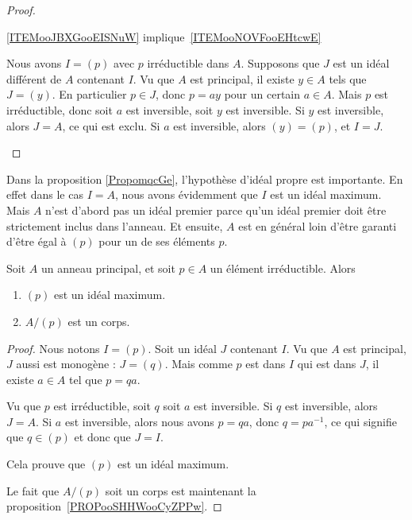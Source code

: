 \begin{proof}
\begin{subproof}
        \item[\ref{ITEMooJBXGooEISNuW} implique~\ref{ITEMooNOVFooEHtcwE}]

            Nous avons \( I=(p)\) avec \( p\) irréductible dans \( A\). Supposons que \( J\) est un idéal différent de \( A\) contenant \( I\). Vu que \( A\) est principal, il existe \( y\in A\) tels que \( J=(y)\). En particulier \( p\in J\), donc \( p=ay\) pour un certain \( a\in A\). Mais \( p\) est irréductible, donc soit \( a\) est inversible, soit \( y\) est inversible. Si \( y\) est inversible, alors \( J=A\), ce qui est exclu. Si \( a\) est inversible, alors \( (y)=(p)\), et \( I=J\).
    \end{subproof}
\end{proof}

\begin{normaltext}
    Dans la proposition \ref{PropomqcGe}, l'hypothèse d'idéal propre est importante. En effet dans le cas \( I=A\), nous avons évidemment que \( I\) est un idéal maximum. Mais \( A\) n'est d'abord pas un idéal premier parce qu'un idéal premier doit être strictement inclus dans l'anneau. Et ensuite, \( A\) est en général loin d'être garanti d'être égal à \( (p)\) pour un de ses éléments \( p\).
\end{normaltext}

\begin{proposition}     \label{PropoTMMXCx}
    Soit \( A \) un anneau principal, et soit \( p \in A \) un élément irréductible. Alors
    \begin{enumerate}
        \item
            \( (p)\) est un idéal maximum.
        \item       \label{ITEMooKPJQooWuPZXS}
            \( A/(p)\) est un corps.
    \end{enumerate}
\end{proposition}

\begin{proof}
    Nous notons \( I=(p)\). Soit un idéal \( J\) contenant \( I\). Vu que \( A\) est principal, \( J\) aussi est monogène : \( J=(q)\). Mais comme \( p\) est dans \( I\) qui est dans \( J\), il existe \( a\in A\) tel que \( p=qa\).

    Vu que \( p\) est irréductible, soit \( q\) soit \( a\) est inversible. Si \( q\) est inversible, alors \( J=A\). Si \( a\) est inversible, alors nous avons \( p=qa\), donc \( q=pa^{-1}\), ce qui signifie que \( q\in(p)\) et donc que \( J=I\).

    Cela prouve que \( (p)\) est un idéal maximum.

    Le fait que \( A/(p)\) soit un corps est maintenant la proposition~\ref{PROPooSHHWooCyZPPw}.
\end{proof}

